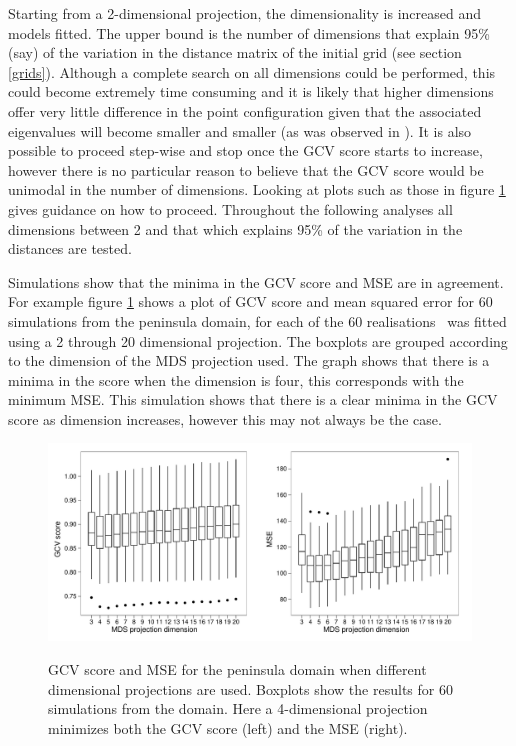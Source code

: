 Starting from a 2-dimensional projection, the dimensionality is increased and models fitted. The upper bound is the number of dimensions that explain 95\% (say) of the variation in the distance matrix of the initial grid (see section \ref{grids}). Although a complete search on all dimensions could be performed, this could become extremely time consuming and it is likely that higher dimensions offer very little difference in the point configuration given that the associated eigenvalues will become smaller and smaller (as was observed in ). It is also possible to proceed step-wise and stop once the GCV score starts to increase, however there is no particular reason to believe that the GCV score would be unimodal in the number of dimensions. Looking at plots such as those in figure \ref{wt2-gcv-projdim-boxplot} gives guidance on how to proceed. Throughout the following analyses all dimensions between 2 and that which explains 95\% of the variation in the distances are tested.

Simulations show that the minima in the GCV score and MSE are in agreement. For example figure \ref{wt2-gcv-projdim-boxplot} shows a plot of GCV score and mean squared error for 60 simulations from the peninsula domain, for each of the 60 realisations \mdsds\ was fitted using a 2 through 20 dimensional projection. The boxplots are grouped according to the dimension of the MDS projection used. The graph shows that there is a minima in the score when the dimension is four, this corresponds with the minimum MSE. This simulation shows that there is a clear minima in the GCV score as dimension increases, however this may not always be the case.

\begin{figure}
\centering
\includegraphics[width=6in]{mds/figs/wt2-gcv-projdim-boxplot.pdf} \\
\caption{GCV score and MSE for the peninsula domain when different dimensional projections are used. Boxplots show the results for 60 simulations from the domain. Here a 4-dimensional projection minimizes both the GCV score (left) and the MSE (right).}
\label{wt2-gcv-projdim-boxplot}
\end{figure}

